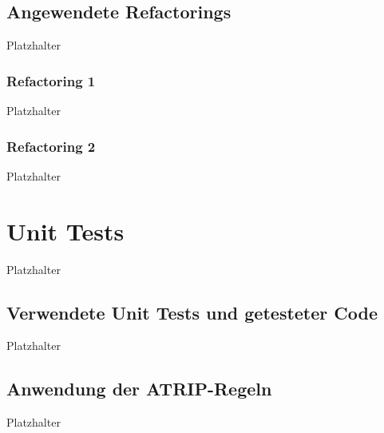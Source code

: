 \documentclass[12pt]{article}
\begin{document}
\subsection{Angewendete Refactorings}
Platzhalter

\subsubsection{Refactoring 1}
Platzhalter

\subsubsection{Refactoring 2}
Platzhalter

\newpage

\section{Unit Tests}
Platzhalter

\subsection{Verwendete Unit Tests und getesteter Code}
Platzhalter

\subsection{Anwendung der ATRIP-Regeln}
Platzhalter


%
\end{document}
